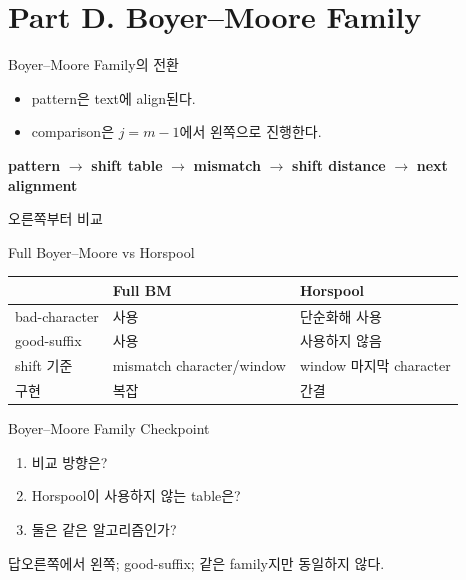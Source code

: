 \section{Part D. Boyer--Moore Family}
\begin{frame}{Boyer--Moore Family의 전환}
\begin{itemize}\item pattern은 text에 align된다.\item comparison은 \(j=m-1\)에서 왼쪽으로 진행한다.\end{itemize}
\begin{center}
\small
\textbf{pattern}
\(\rightarrow\)
\textbf{shift table}
\(\rightarrow\)
\textcolor{AlgoOrange}{\textbf{mismatch}}
\(\rightarrow\)
\textbf{shift distance}
\(\rightarrow\)
\textbf{next alignment}
\end{center}
\end{frame}
\begin{frame}{오른쪽부터 비교}
\centering{}
\end{frame}
\begin{frame}{Full Boyer--Moore vs Horspool}
\small\begin{tabular}{lll}\toprule
&Full BM&Horspool\\\midrule
bad-character&사용&단순화해 사용\\
good-suffix&사용&사용하지 않음\\
shift 기준&mismatch character/window&window 마지막 character\\
구현&복잡&간결\\\bottomrule
\end{tabular}
\end{frame}
\begin{frame}{Boyer--Moore Family Checkpoint}
\begin{enumerate}\item 비교 방향은?\item Horspool이 사용하지 않는 table은?\item 둘은 같은 알고리즘인가?\end{enumerate}
\begin{exampleblock}{답}오른쪽에서 왼쪽; good-suffix; 같은 family지만 동일하지 않다.\end{exampleblock}
\end{frame}
